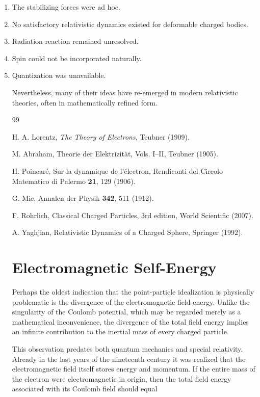 \begin{enumerate}

\item The stabilizing forces were ad hoc.

\item No satisfactory relativistic dynamics existed for deformable charged
bodies.

\item Radiation reaction remained unresolved.

\item Spin could not be incorporated naturally.

\item Quantization was unavailable.

Nevertheless, many of their ideas have re-emerged in modern relativistic
theories, often in mathematically refined form.
\begin{thebibliography}{99}

H. A. Lorentz,
\emph{The Theory of Electrons},
Teubner (1909).

M. Abraham,
Theorie der Elektrizität,
Vols. I--II,
Teubner (1905).

H. Poincaré,
Sur la dynamique de l'électron,
Rendiconti del Circolo Matematico di Palermo
\textbf{21}, 129 (1906).

G. Mie,
Annalen der Physik
\textbf{342}, 511 (1912).

F. Rohrlich,
Classical Charged Particles,
3rd edition,
World Scientific (2007).

A. Yaghjian,
Relativistic Dynamics of a Charged Sphere,
Springer (1992).

\end{thebibliography}

\section{Electromagnetic Self-Energy}

Perhaps the oldest indication that the point-particle idealization is
physically problematic is the divergence of the electromagnetic field energy.
Unlike the singularity of the Coulomb potential, which may be regarded merely
as a mathematical inconvenience, the divergence of the total field energy
implies an infinite contribution to the inertial mass of every charged
particle.

This observation predates both quantum mechanics and special relativity.
Already in the last years of the nineteenth century it was realized that the
electromagnetic field itself stores energy and momentum. If the entire mass of
the electron were electromagnetic in origin, then the total field energy
associated with its Coulomb field should equal


\end{enumerate}
